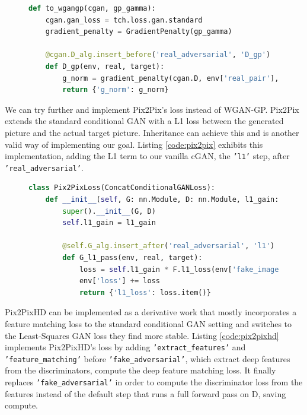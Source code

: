 \begin{figure}
\begin{lstlisting}[language=Python, label=code:wgangp, caption=ConcatConditionalGAN with WGAN-GP regularizer]
def to_wgangp(cgan, gp_gamma):
    cgan.gan_loss = tch.loss.gan.standard
    gradient_penalty = GradientPenalty(gp_gamma)

    @cgan.D_alg.insert_before('real_adversarial', 'D_gp')
    def D_gp(env, real, target):
        g_norm = gradient_penalty(cgan.D, env['real_pair'], env['fake_pair'])
        return {'g_norm': g_norm}
\end{lstlisting}
\end{figure}

We can try further and implement Pix2Pix's loss instead of WGAN-GP. Pix2Pix extends the standard conditional GAN with a L1 loss between the generated picture and the actual target picture. Inheritance can achieve this and is another valid way of implementing our goal. Listing \ref{code:pix2pix} exhibits this implementation, adding the L1 term to our vanilla cGAN, the \texttt{'l1'} step, after \texttt{'real\_adversarial'}.

\begin{figure}
\begin{lstlisting}[language=Python, label=code:pix2pix, caption=Pix2Pix from ConcatConditionalGAN]
class Pix2PixLoss(ConcatConditionalGANLoss):
    def __init__(self, G: nn.Module, D: nn.Module, l1_gain: float) -> None:
        super().__init__(G, D)
        self.l1_gain = l1_gain

        @self.G_alg.insert_after('real_adversarial', 'l1')
        def G_l1_pass(env, real, target):
            loss = self.l1_gain * F.l1_loss(env['fake_image'], target)
            env['loss'] += loss
            return {'l1_loss': loss.item()}
\end{lstlisting}
\end{figure}

Pix2PixHD can be implemented as a derivative work that mostly incorporates a feature matching loss to the standard conditional GAN setting and switches to the Least-Squares GAN loss they find more stable. Listing \ref{code:pix2pixhd} implements Pix2PixHD's loss by adding \texttt{'extract\_features'} and \texttt{'feature\_matching'} before \texttt{'fake\_adversarial'}, which extract deep features from the discriminators, compute the deep feature matching loss. It finally replaces \texttt{'fake\_adversarial'} in order to compute the discriminator loss from the features instead of the default step that runs a full forward pass on D, saving compute.


